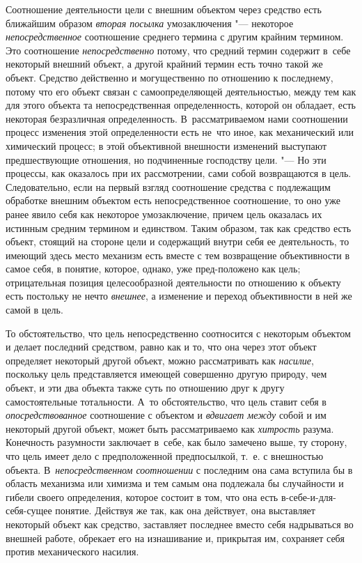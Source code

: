 Соотношение деятельности цели с внешним объектом через
средство есть ближайшим образом {\em вторая посылка}
умозаключения "--- некоторое {\em непосредственное}
соотношение среднего термина с другим крайним термином. Это
соотношение {\em непосредственно}
потому, что средний термин содержит в~себе некоторый внешний
объект, а другой крайний термин есть точно такой же объект. Средство
действенно и могущественно по отношению к последнему, потому что его объект
связан с самоопределяющей деятельностью, между тем как для этого объекта та
непосредственная определенность, которой он обладает, есть некоторая
безразличная определенность. В~рассматриваемом нами соотношении процесс
изменения этой определенности есть не~что иное, как механический или
химический процесс; в этой объективной внешности изменений выступают
предшествующие отношения, но подчиненные господству цели. "---
Но эти процессы, как оказалось при их рассмотрении, сами
собой возвращаются в цель. Следовательно, если на первый взгляд соотношение
средства с подлежащим обработке внешним объектом есть непосредственное
соотношение, то оно уже ранее явило себя как некоторое умозаключение,
причем цель оказалась их истинным средним термином и единством. Таким
образом, так как средство есть объект, стоящий на стороне цели и содержащий
внутри себя ее деятельность, то имеющий здесь место механизм есть вместе с
тем возвращение объективности в самое себя, в понятие, которое, однако, уже
пред-положено как цель; отрицательная позиция целесообразной деятельности
по отношению к объекту есть постольку не нечто
{\em внешнее}, а
изменение и переход объективности в ней же самой в цель.

То обстоятельство, что цель непосредственно соотносится с
некоторым объектом и делает последний средством, равно как и то, что она
через этот объект определяет некоторый другой объект, можно рассматривать
как {\em насилие},
поскольку цель представляется имеющей совершенно другую
природу, чем объект, и эти два объекта также суть по отношению друг к другу
самостоятельные тотальности. А~то обстоятельство, что цель ставит себя в
{\em опосредствованное}
соотношение с объектом и
{\em вдвигает между}
собой и им некоторый другой объект, может быть рассматриваемо
как {\em хитрость}
разума. Конечность разумности заключает в~себе, как было
замечено выше, ту сторону, что цель имеет дело с
предположенной предпосылкой, т.~е. с внешностью объекта.
В~{\em непосредственном соотношении}
с последним она сама вступила бы в область механизма или
химизма и тем самым она подлежала бы случайности и гибели своего
определения, которое состоит в том, что она есть в-себе-и-для-себя-сущее
понятие. Действуя же так, как она действует, она выставляет некоторый
объект как средство, заставляет последнее вместо себя надрываться во
внешней работе, обрекает его на изнашивание и, прикрытая им, сохраняет себя
против механического насилия.

